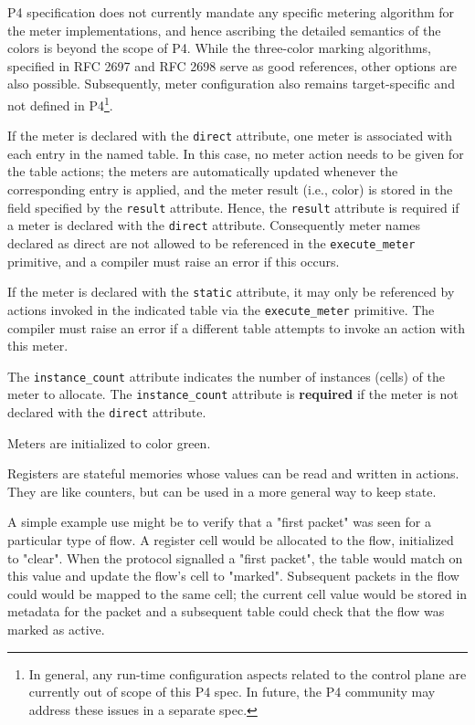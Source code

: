 \documentclass[12pt]{article}
\begin{document}
P4 specification does not currently mandate any specific metering
algorithm for the meter implementations, and hence ascribing the
detailed semantics of the colors is beyond the scope of P4. While
the three-color marking algorithms, specified in RFC 2697 and RFC 2698
serve as good references, other options are also possible. Subsequently,
meter configuration also remains target-specific and not defined
in P4\footnote{In general, any run-time configuration aspects related
to the control plane are currently out of scope of this P4 spec. In future,
the P4 community may address these issues in a separate spec.}.

If the meter is declared with the \texttt{direct} attribute, one meter
is associated with each entry in the named table. In this case, no
meter action needs to be given for the table actions; the meters are
automatically updated whenever the corresponding entry is applied,
and the meter result (i.e., color) is stored in the field specified
by the \texttt{result} attribute. Hence, the \texttt{result} attribute
is required if a meter is declared with the \texttt{direct} attribute.
Consequently meter names declared as direct are not allowed to be
referenced in the \texttt{execute_meter} primitive, and a compiler must
raise an error if this occurs.

If the meter is declared with the \texttt{static} attribute, it may only
be referenced by actions invoked in the indicated table via the \texttt{execute_meter}
primitive. The compiler must raise an error if a different table
attempts to invoke an action with this meter.

The \texttt{instance_count} attribute indicates the number of
instances (cells) of the meter to allocate.  The
\texttt{instance_count} attribute is \textbf{required} if the meter
is not declared with the \texttt{direct} attribute.

Meters are initialized to color green.


Registers are stateful memories whose values can be read and written
in actions.  They are like counters, but can be used in a more general
way to keep state.

A simple example use might be to verify that a "first packet" was seen
for a particular type of flow. A register cell would be allocated to
the flow, initialized to "clear". When the protocol signalled a "first
packet", the table would match on this value and update the flow's
cell to "marked".  Subsequent packets in the flow could would be
mapped to the same cell; the current cell value would be stored in
metadata for the packet and a subsequent table could check that the
flow was marked as active.
\end{document}
